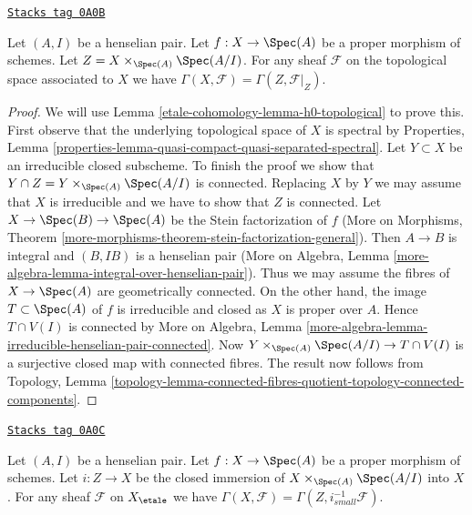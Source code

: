 \begin{lemma}
\label{etale-cohomology-lemma-zariski-h0-proper-over-henselian-pair}
\href{https://stacks.math.columbia.edu/tag/0A0B}{\texttt{Stacks tag 0A0B}}

Let $(A, I)$ be a henselian pair. Let $f : X \to \Spec(A)$ be a proper morphism
of schemes. Let $Z = X \times_{\Spec(A)} \Spec(A/I)$. For any
sheaf $\mathcal{F}$ on the topological space associated to $X$ we
have $\Gamma(X, \mathcal{F}) = \Gamma(Z, \mathcal{F}|_Z)$.
\end{lemma}

\begin{proof}
We will use Lemma \ref{etale-cohomology-lemma-h0-topological} to prove this. First observe
that the underlying topological space of $X$ is spectral by Properties, Lemma
\ref{properties-lemma-quasi-compact-quasi-separated-spectral}.
Let $Y \subset X$ be an irreducible closed subscheme. To finish the proof
we show that $Y \cap Z = Y \times_{\Spec(A)} \Spec(A/I)$ is connected.
Replacing $X$ by $Y$
we may assume that $X$ is irreducible and we have to show that $Z$
is connected. Let $X \to \Spec(B) \to \Spec(A)$ be the Stein factorization
of $f$ (More on Morphisms, Theorem
\ref{more-morphisms-theorem-stein-factorization-general}).
Then $A \to B$ is integral and $(B, IB)$ is a henselian pair
(More on Algebra, Lemma \ref{more-algebra-lemma-integral-over-henselian-pair}).
Thus we may assume the fibres of $X \to \Spec(A)$ are geometrically
connected. On the other hand, the image $T \subset \Spec(A)$ of $f$
is irreducible and closed as $X$ is proper over $A$. Hence $T \cap V(I)$
is connected by More on Algebra, Lemma
\ref{more-algebra-lemma-irreducible-henselian-pair-connected}.
Now $Y \times_{\Spec(A)} \Spec(A/I) \to T \cap V(I)$
is a surjective closed map with connected fibres.
The result now follows from Topology, Lemma
\ref{topology-lemma-connected-fibres-quotient-topology-connected-components}.
\end{proof}

\begin{lemma}
\label{etale-cohomology-lemma-h0-proper-over-henselian-pair}
\href{https://stacks.math.columbia.edu/tag/0A0C}{\texttt{Stacks tag 0A0C}}

Let $(A, I)$ be a henselian pair. Let $f : X \to \Spec(A)$ be a proper morphism
of schemes. Let $i : Z \to X$ be the closed immersion of
$X \times_{\Spec(A)} \Spec(A/I)$ into $X$. For any
sheaf $\mathcal{F}$ on $X_\etale$ we
have $\Gamma(X, \mathcal{F}) = \Gamma(Z, i_{small}^{-1}\mathcal{F})$.
\end{lemma}

